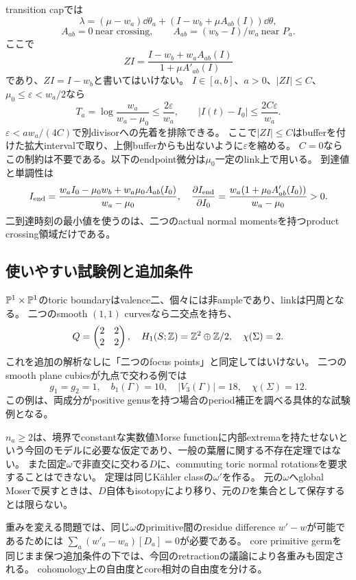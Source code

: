 \documentclass[11pt,a4paper]{article}
\begin{document}
transition capでは
\[
 \lambda=(\mu-w_a)\dd\theta_a+
 (I-w_b+\mu A_{ab}(I))\dd\theta,
\]
\[
 A_{ab}=0\ \text{near crossing},\qquad
 A_{ab}=(w_b-I)/w_a\ \text{near }P_a.
\]
ここで
\[
 ZI=\frac{I-w_b+w_aA_{ab}(I)}{1+\mu A'_{ab}(I)}
\]
であり、$ZI=I-w_b$と書いてはいけない。
$I\in[a,b]$、$a>0$、$|ZI|\le C$、$\mu_0\le\varepsilon<w_a/2$なら
\[
 T_a=\log\frac{w_a}{w_a-\mu_0}\le\frac{2\varepsilon}{w_a},
 \qquad |I(t)-I_0|\le\frac{2C\varepsilon}{w_a}.
\]
$\varepsilon<a w_a/(4C)$で別divisorへの先着を排除できる。
ここで$|ZI|\le C$はbufferを付けた拡大intervalで取り、上側bufferからも出ないように$\varepsilon$を縮める。
$C=0$ならこの制約は不要である。以下のendpoint微分は$\mu_0$一定のlink上で用いる。
到達値と単調性は
\[
 I_{\rm end}=\frac{w_aI_0-\mu_0w_b+w_a\mu_0A_{ab}(I_0)}{w_a-\mu_0},
 \quad
 \frac{\partial I_{\rm end}}{\partial I_0}
 =\frac{w_a(1+\mu_0A'_{ab}(I_0))}{w_a-\mu_0}>0.
\]
二到達時刻の最小値を使うのは、二つのactual normal momentsを持つproduct crossing領域だけである。

\subsection{使いやすい試験例と追加条件}

$\mathbb P^1\times\mathbb P^1$のtoric boundaryはvalence二、個々には非ampleであり、linkは円周となる。
二つのsmooth $(1,1)$ curvesなら二交点を持ち、
\[
 Q=\begin{pmatrix}2&2\\2&2\end{pmatrix},\quad
 H_1(S;\mathbb Z)=\mathbb Z^2\oplus\mathbb Z/2,\quad \chi(\Sigma)=2.
\]
これを追加の解析なしに「二つのfocus points」と同定してはいけない。
二つのsmooth plane cubicsが九点で交わる例では
\[
 g_1=g_2=1,\quad b_1(\Gamma)=10,\quad |V_3(\Gamma)|=18,\quad
 \chi(\Sigma)=12.
\]
この例は、両成分がpositive genusを持つ場合のperiod補正を調べる具体的な試験例となる。

$n_a\ge2$は、境界でconstantな実数値Morse functionに内部extremaを持たせないという今回のモデルに必要な仮定であり、一般の葉層に関する不存在定理ではない。
また固定$\omega$で非直交に交わる$D$に、commuting toric normal rotationsを要求することはできない。
定理は同じKähler classの$\omega'$を作る。
元の$\omega$へglobal Moserで戻すときは、$D$自体もisotopyにより移り、元の$D$を集合として保存するとは限らない。

重みを変える問題では、同じ$\omega$のprimitive間のresidue difference $w'-w$が可能であるためには
$\sum_a(w'_a-w_a)[D_a]=0$が必要である。
core primitive germを同じまま保つ追加条件の下では、今回のretractionの議論により各重みも固定される。
cohomology上の自由度とcore相対の自由度を分ける。
\end{document}
